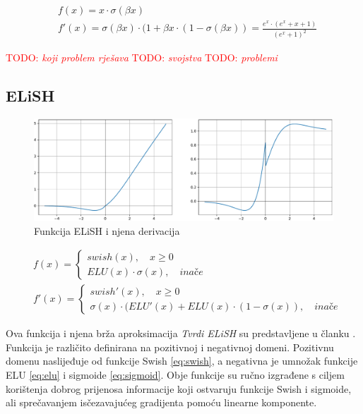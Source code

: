 \documentclass[times, utf8, diplomski]{fer}
\def\otherwise{\textit{inače}}
\def\TODO#1{\noindent\textcolor{red}{TODO: \textit{#1}}\newline}
\def\todo#1{\TODO{#1}}
\begin{document}
\begin{equation}
\label{eq:swish}
\begin{split}
&f(x) = x \cdot \sigma(\beta x)
\\
&f'(x) = \sigma(\beta x) \cdot (1 + \beta x \cdot (1-\sigma(\beta x)) = \frac{e^x \cdot (e^x + x + 1)}{(e^x + 1)^2}
\end{split}
\end{equation}

\todo{koji problem rješava}
\todo{svojstva}
\todo{problemi}

\subsection{ELiSH}
\label{func:elish}

\begin{figure}[H]
\includegraphics[width=\textwidth]{ELiSH.pdf}
\centering
\caption{Funkcija ELiSH i njena derivacija}
\label{fig:elish}
\end{figure}

\begin{equation}
\begin{split}
&f(x) = 
	\begin{cases}
		swish(x), \quad x \geq 0 \\
		ELU(x) \cdot \sigma(x), \quad \otherwise
	\end{cases} \\
&f'(x) =
	\begin{cases}
		swish'(x), \quad x \geq 0 \\
		\sigma(x) \cdot (ELU'(x) + ELU(x) \cdot (1-\sigma(x)), \quad \otherwise
	\end{cases}
\end{split}
\end{equation}

Ova funkcija i njena brža aproksimacija \textit{Tvrdi ELiSH} su predstavljene u članku \citet{elish}. Funkcija je različito definirana na pozitivnoj i negativnoj domeni. Pozitivnu domenu naslijeđuje od funkcije Swish \eqref{eq:swish}, a negativna je umnožak funkcije ELU \eqref{eq:elu} i sigmoide \eqref{eq:sigmoid}. Obje funkcije su ručno izgrađene s ciljem korištenja dobrog prijenosa informacije koji ostvaruju funkcije Swish i sigmoide, ali sprečavanjem isčezavajućeg gradijenta pomoću linearne komponente.
\end{document}

